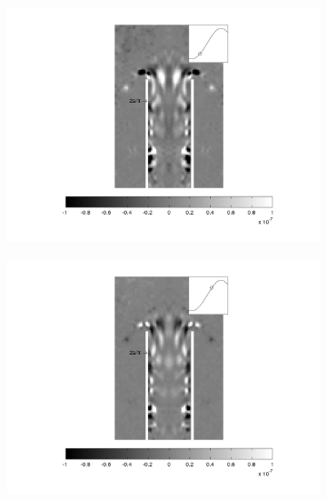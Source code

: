 \begin{landscape}
\begin{figure}[ht!]
\begin{subfigure}{0.55 \textwidth}
  \includegraphics[width=1.\linewidth]{figuras/max_ka_007_3.png}
  \caption[]{}
  \label{fig:max_007_3}
\end{subfigure}
\par\medskip
\begin{subfigure}{0.55 \textwidth}
  \includegraphics[width=1.\linewidth]{figuras/max_ka_007_4.png}
  \caption[]{}
  \label{fig:max_007_4}
\end{subfigure}
\begin{subfigure}{0.55 \textwidth}

\end{subfigure}
\end{figure}
\end{landscape}
